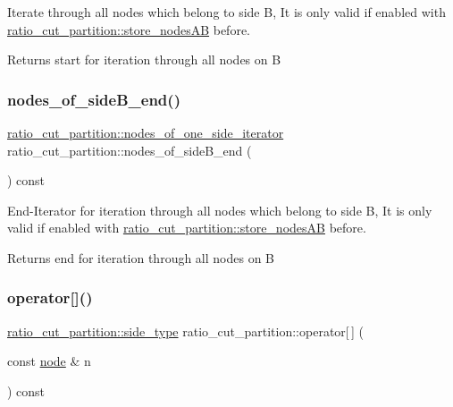 Iterate through all nodes which belong to side {\ttfamily B}, It is only valid if enabled with \mbox{\hyperlink{classratio__cut__partition_af0efdeab02cb235df47e2339c196051f}{ratio\+\_\+cut\+\_\+partition\+::store\+\_\+nodes\+AB}} before.

\begin{DoxyReturn}{Returns}
start for iteration through all nodes on {\ttfamily B} 
\end{DoxyReturn}
\mbox{\label{classratio__cut__partition_a838e3ab6d00155c1f3868cc920a4a8f6}} 
\subsubsection{\texorpdfstring{nodes\+\_\+of\+\_\+side\+B\+\_\+end()}{nodes\_of\_sideB\_end()}}
{\footnotesize\ttfamily \mbox{\hyperlink{classratio__cut__partition_a4f667099b56ded1bfef8f1fb4d09f81c}{ratio\+\_\+cut\+\_\+partition\+::nodes\+\_\+of\+\_\+one\+\_\+side\+\_\+iterator}} ratio\+\_\+cut\+\_\+partition\+::nodes\+\_\+of\+\_\+side\+B\+\_\+end (\begin{DoxyParamCaption}{ }\end{DoxyParamCaption}) const}

End-\/\+Iterator for iteration through all nodes which belong to side {\ttfamily B}, It is only valid if enabled with \mbox{\hyperlink{classratio__cut__partition_af0efdeab02cb235df47e2339c196051f}{ratio\+\_\+cut\+\_\+partition\+::store\+\_\+nodes\+AB}} before.

\begin{DoxyReturn}{Returns}
end for iteration through all nodes on {\ttfamily B} 
\end{DoxyReturn}
\mbox{\label{classratio__cut__partition_a47358935eb416c38969b66fbf3f095b5}} 
\subsubsection{\texorpdfstring{operator[]()}{operator[]()}}
{\footnotesize\ttfamily \mbox{\hyperlink{classratio__cut__partition_ace53442bd0c1e21fbf00858ec6f6b456}{ratio\+\_\+cut\+\_\+partition\+::side\+\_\+type}} ratio\+\_\+cut\+\_\+partition\+::operator\mbox{[}$\,$\mbox{]} (\begin{DoxyParamCaption}\item[{const \mbox{\hyperlink{classnode}{node}} \&}]{n }\end{DoxyParamCaption}) const}

